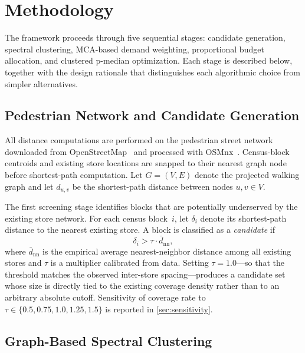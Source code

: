 \section{Methodology}
\label{sec:methodology}

The framework proceeds through five sequential stages:
candidate generation, spectral clustering, MCA-based demand weighting,
proportional budget allocation, and clustered \mbox{p-median} optimization.
Each stage is described below, together with the design rationale
that distinguishes each algorithmic choice from simpler alternatives.

\subsection{Pedestrian Network and Candidate Generation}
\label{ssec:network}

All distance computations are performed on the pedestrian street network
downloaded from OpenStreetMap~\cite{osm2025} and processed with
OSMnx~\cite{boeing2017osmnx}.
Census-block centroids and existing store locations are snapped to their
nearest graph node before shortest-path computation.
Let $G = (V, E)$ denote the projected walking graph and let $d_{u,v}$
be the shortest-path distance between nodes $u, v \in V$.

The first screening stage identifies blocks that are potentially underserved
by the existing store network.
For each census block~$i$, let $\delta_i$ denote its shortest-path distance
to the nearest existing store.
A block is classified as a \emph{candidate} if
\begin{equation}
  \delta_i > \tau \cdot \bar{d}_{\text{nn}},
  \label{eq:threshold}
\end{equation}
where $\bar{d}_{\text{nn}}$ is the empirical average nearest-neighbor distance
among all existing stores and $\tau$ is a multiplier calibrated from data.
Setting $\tau = 1.0$—so that the threshold matches the observed inter-store
spacing—produces a candidate set whose size is directly tied to the
existing coverage density rather than to an arbitrary absolute cutoff.
Sensitivity of coverage rate to $\tau \in \{0.5, 0.75, 1.0, 1.25, 1.5\}$
is reported in \cref{sec:sensitivity}.

\subsection{Graph-Based Spectral Clustering}
\label{ssec:spectral}

